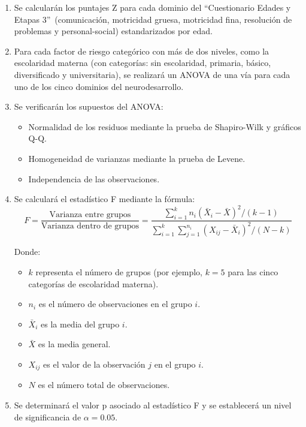 \documentclass[11pt,letterpaper]{report}
\newcommand{\asq}{“Cuestionario Edades y Etapas 3”}
\begin{document}
\begin{enumerate}
    \item Se calcularán los puntajes Z para cada dominio del \asq\ 
    (comunicación, motricidad gruesa, motricidad fina, resolución de problemas 
    y personal-social) estandarizados por edad.
    
    \item Para cada factor de riesgo categórico con más de dos niveles, como 
    la escolaridad materna (con categorías: sin escolaridad, primaria, básico, 
    diversificado y universitaria), se realizará un ANOVA de una vía para cada
    uno de los cinco dominios del neurodesarrollo.
    
    \item Se verificarán los supuestos del ANOVA:
    \begin{itemize}
        \item Normalidad de los residuos mediante la prueba de 
        Shapiro-Wilk y gráficos Q-Q.
        \item Homogeneidad de varianzas mediante la prueba de Levene.
        \item Independencia de las observaciones.
    \end{itemize}
    
    \item Se calculará el estadístico F mediante la fórmula:
    \[
    F = \frac{\text{Varianza entre grupos}}{\text{Varianza dentro de grupos}} = 
    \frac{\sum_{i=1}^k n_i(\bar{X}_i - \bar{X})^2/(k-1)}
    {\sum_{i=1}^k\sum_{j=1}^{n_i}(X_{ij} - \bar{X}_i)^2/(N-k)}
    \]
    
    Donde:
    \begin{itemize}
        \item $k$ representa el número de grupos (por ejemplo, $k = 5$ para las
        cinco categorías de escolaridad materna).
        \item $n_i$ es el número de observaciones en el grupo $i$.
        \item $\bar{X}_i$ es la media del grupo $i$.
        \item $\bar{X}$ es la media general.
        \item $X_{ij}$ es el valor de la observación $j$ en el grupo $i$.
        \item $N$ es el número total de observaciones.
    \end{itemize}
    
    \item Se determinará el valor p asociado al estadístico F y se establecerá
    un nivel de significancia de $\alpha = 0.05$.
\end{enumerate}
\end{document}
